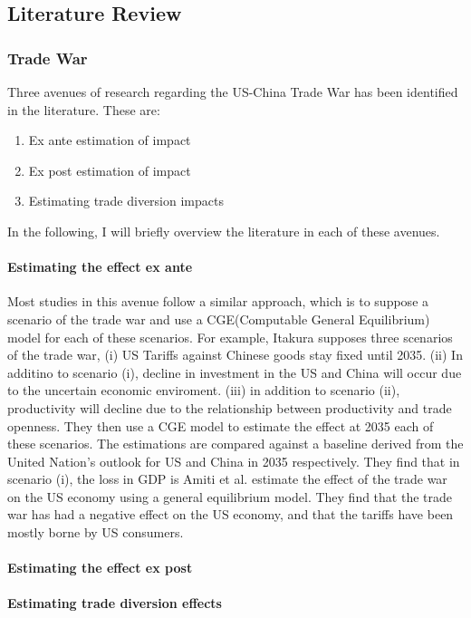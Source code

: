 \documentclass[a4paper, 12pt]{article}
\begin{document}
    \subsection{Literature Review}
        \subsubsection{Trade War}
        Three avenues of research regarding the US-China Trade War has been identified in the literature. 
        These are: 
        \begin{enumerate}[i]
            \item Ex ante estimation of impact 
            \item Ex post estimation of impact 
            \item Estimating trade diversion impacts
        \end{enumerate}
        In the following, I will briefly overview the literature in each of these avenues.
        \paragraph{Estimating the effect ex ante}
        Most studies in this avenue follow a similar approach, which is to suppose a scenario of the trade war and use a CGE(Computable General Equilibrium) model for each of these scenarios.
        For example, Itakura\cite{Itakura2020} supposes three scenarios of the trade war, (i) US Tariffs against Chinese goods stay fixed until 2035.
        (ii) In additino to scenario (i), decline in investment in the US and China will occur due to the uncertain economic enviroment.
        (iii) in addition to scenario (ii), productivity will decline due to the relationship between productivity and trade openness.
        They then use a CGE model to estimate the effect at 2035 each of these scenarios.
        The estimations are compared against a baseline derived from the United Nation's outlook for US and China in 2035 respectively.
        They find that in scenario (i), the loss in GDP is 
        Amiti et al.\cite{Amiti2019} estimate the effect of the trade war on the US economy using a general equilibrium model.
        They find that the trade war has had a negative effect on the US economy, and that the tariffs have been mostly borne by US consumers.
        \paragraph{Estimating the effect ex post}
        \paragraph{Estimating trade diversion effects}
\end{document}
